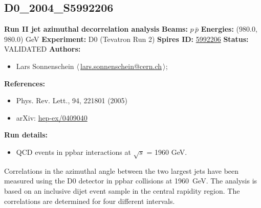 \subsection[D0\_2004\_S5992206]{D0\_2004\_S5992206\,\cite{Abazov:2004hm}}
\textbf{Run II jet azimuthal decorrelation analysis}\newline
\textbf{Beams:} $p$\,$\bar{p}$ \newline
\textbf{Energies:} (980.0, 980.0) GeV \newline
\textbf{Experiment:} D0 (Tevatron Run 2) \newline
\textbf{Spires ID:} \href{http://www.slac.stanford.edu/spires/find/hep/www?rawcmd=key+5992206}{5992206}\newline
\textbf{Status:} VALIDATED\newline
\textbf{Authors:}
\begin{itemize}
  \item Lars Sonnenschein $\langle\,$\href{mailto:lars.sonnenschein@cern.ch}{lars.sonnenschein@cern.ch}$\,\rangle$;
\end{itemize}
\textbf{References:}
\begin{itemize}
  \item Phys. Rev. Lett., 94, 221801 (2005)
  \item arXiv: \href{http://arxiv.org/abs/hep-ex/0409040}{hep-ex/0409040}
\end{itemize}
\textbf{Run details:}
\begin{itemize}

  \item QCD events in ppbar interactions at \ensuremath{\sqrt{s}} = 1960 GeV.\end{itemize}

\noindent Correlations in the azimuthal angle between the two largest \pT jets have been measured using the D0 detector in ppbar collisions at 1960~GeV. The analysis is based on an inclusive dijet event sample in the central rapidity region. The correlations are determined for four different \pT intervals.

\clearpage


\clearpage

